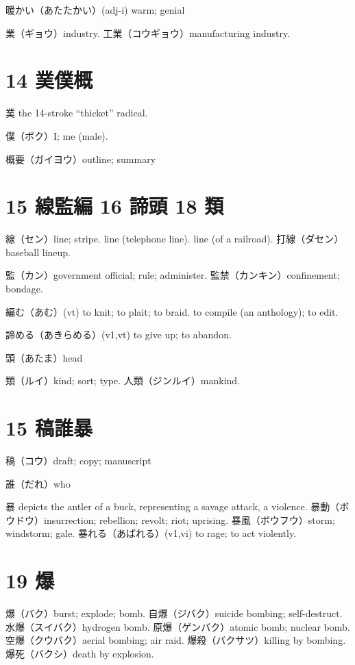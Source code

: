 暖かい（あたたかい）(adj-i) warm; genial

業（ギョウ）industry.
工業（コウギョウ）manufacturing industry.

\section{14 菐僕概}

菐 the 14-stroke ``thicket'' radical.

僕（ボク）I; me (male).

概要（ガイヨウ）outline; summary

\section{15 線監編 16 諦頭 18 類}

線（セン）line; stripe.
line (telephone line).
line (of a railroad).
打線（ダセン）baseball lineup.

監（カン）government official; rule; administer.
監禁（カンキン）confinement; bondage.

編む（あむ）(vt)
to knit; to plait; to braid.
to compile (an anthology); to edit.

諦める（あきらめる）(v1,vt)
to give up; to abandon.

頭（あたま）head

類（ルイ）kind; sort; type.
人類（ジンルイ）mankind.

\section{15 稿誰暴}

稿（コウ）draft; copy; manuscript

誰（だれ）who

暴 depicts the antler of a buck, representing a savage attack, a violence.
暴動（ボウドウ）insurrection; rebellion; revolt; riot; uprising.
暴風（ボウフウ）storm; windstorm; gale.
暴れる（あばれる）(v1,vi) to rage; to act violently.

\section{19 爆}

爆（バク）burst; explode; bomb.
自爆（ジバク）suicide bombing; self-destruct.
水爆（スイバク）hydrogen bomb.
原爆（ゲンバク）atomic bomb; nuclear bomb.
空爆（クウバク）aerial bombing; air raid.
爆殺（バクサツ）killing by bombing.
爆死（バクシ）death by explosion.

